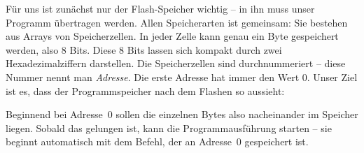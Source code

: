 \documentclass[a4paper,12pt]{article}
\begin{document}
\noindent
Für uns ist zunächst nur der Flash-Speicher wichtig – in ihn muss unser
Programm übertragen werden.  Allen Speicherarten ist gemeinsam: Sie bestehen
aus Arrays von Speicherzellen.  In jeder Zelle kann genau ein Byte gespeichert
werden, also 8 Bits. Diese 8 Bits lassen sich kompakt durch zwei
Hexadezimalziffern darstellen. Die Speicherzellen sind durchnummeriert – diese
Nummer nennt man \emph{Adresse}.  Die erste Adresse hat immer den Wert 0.
Unser Ziel ist es, dass der Programmspeicher nach dem Flashen so aussieht:


\begin{center}
\end{center}

\noindent
Beginnend bei Adresse~0 sollen die einzelnen Bytes also nacheinander im
Speicher liegen. Sobald das gelungen ist, kann die Programmausführung starten –
sie beginnt automatisch mit dem Befehl, der an Adresse~0 gespeichert ist.
\end{document}
